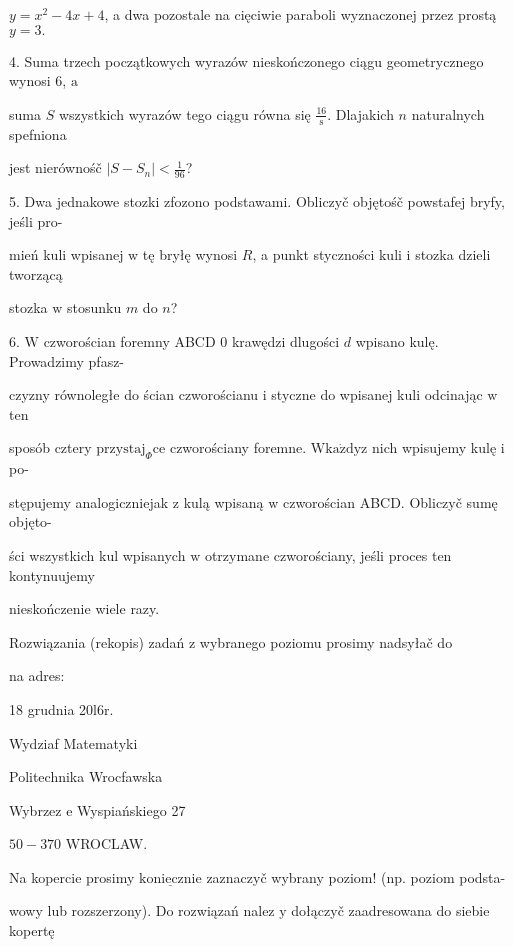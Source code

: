 \documentclass[a4paper,12pt]{article}
\begin{document}
$y=x^{2}-4x+4$, a dwa pozostale na cięciwie paraboli wyznaczonej przez prostą $y=3.$

4. Suma trzech początkowych wyrazów nieskończonego ciągu geometrycznego wynosi 6, $\mathrm{a}$

suma $S$ wszystkich wyrazów tego ciągu równa się $\displaystyle \frac{16}{\mathrm{s}}$. Dlajakich $n$ naturalnych spefniona

jest nierównośč $|S-S_{n}|<\displaystyle \frac{1}{96}$?

5. Dwa jednakowe stozki zfozono podstawami. Obliczyč objętośč powstafej bryfy, jeśli pro-

mień kuli wpisanej $\mathrm{w}$ tę bryłę wynosi $R$, a punkt styczności kuli $\mathrm{i}$ stozka dzieli tworzącą

stozka $\mathrm{w}$ stosunku $m$ do $n$?

6. $\mathrm{W}$ czworościan foremny ABCD $0$ krawędzi dlugości $d$ wpisano kulę. Prowadzimy pfasz-

czyzny równoległe do ścian czworościanu $\mathrm{i}$ styczne do wpisanej kuli odcinając $\mathrm{w}$ ten

sposób cztery $\mathrm{p}\mathrm{r}\mathrm{z}\mathrm{y}\mathrm{s}\mathrm{t}\mathrm{a}\mathrm{j}_{\Phi}\mathrm{c}\mathrm{e}$ czworościany foremne. $\mathrm{W}\mathrm{k}\mathrm{a}\dot{\mathrm{z}}\mathrm{d}\mathrm{y}\mathrm{z}$ nich wpisujemy kulę $\mathrm{i}$ po-

stępujemy analogiczniejak $\mathrm{z}$ kulą wpisaną $\mathrm{w}$ czworościan ABCD. Obliczyč sumę objęto-

ści wszystkich kul wpisanych $\mathrm{w}$ otrzymane czworościany, jeśli proces ten kontynuujemy

nieskończenie wiele razy.

Rozwiązania (rekopis) zadań z wybranego poziomu prosimy nadsyłač do

na adres:

18 grudnia 20l6r.

Wydziaf Matematyki

Politechnika Wrocfawska

Wybrzez $\mathrm{e}$ Wyspiańskiego 27

$50-370$ WROCLAW.

Na kopercie prosimy $\underline{\mathrm{k}\mathrm{o}\mathrm{n}\mathrm{i}\mathrm{e}\mathrm{c}\mathrm{z}\mathrm{n}\mathrm{i}\mathrm{e}}$ zaznaczyč wybrany poziom! (np. poziom podsta-

wowy lub rozszerzony). Do rozwiązań nalez $\mathrm{y}$ dołączyč zaadresowana do siebie kopertę
\end{document}

